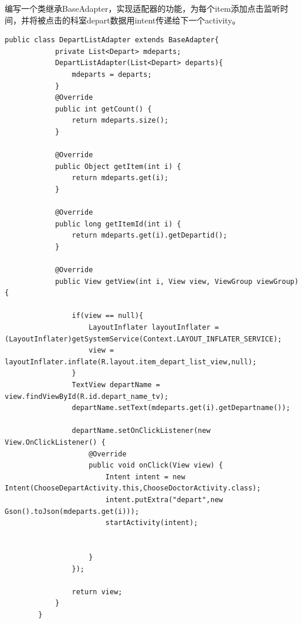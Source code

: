 \documentclass[UTF8,12pt]{article}
\begin{document}
\begin{enumerate}
    编写一个类继承BaseAdapter，实现适配器的功能，为每个item添加点击监听时间，并将被点击的科室depart数据用intent传递给下一个activity。

    \begin{lstlisting}[frame=shadowbox]
        public class DepartListAdapter extends BaseAdapter{
            private List<Depart> mdeparts;
            DepartListAdapter(List<Depart> departs){
                mdeparts = departs;
            }
            @Override
            public int getCount() {
                return mdeparts.size();
            }
    
            @Override
            public Object getItem(int i) {
                return mdeparts.get(i);
            }
    
            @Override
            public long getItemId(int i) {
                return mdeparts.get(i).getDepartid();
            }
    
            @Override
            public View getView(int i, View view, ViewGroup viewGroup) {
    
                if(view == null){
                    LayoutInflater layoutInflater = (LayoutInflater)getSystemService(Context.LAYOUT_INFLATER_SERVICE);
                    view = layoutInflater.inflate(R.layout.item_depart_list_view,null);
                }
                TextView departName = view.findViewById(R.id.depart_name_tv);
                departName.setText(mdeparts.get(i).getDepartname());
    
                departName.setOnClickListener(new View.OnClickListener() {
                    @Override
                    public void onClick(View view) {
                        Intent intent = new Intent(ChooseDepartActivity.this,ChooseDoctorActivity.class);
                        intent.putExtra("depart",new Gson().toJson(mdeparts.get(i)));
                        startActivity(intent);
    
    
                    }
                });
    
                return view;
            }
        }
    \end{lstlisting}

\end{enumerate}
\end{document}
